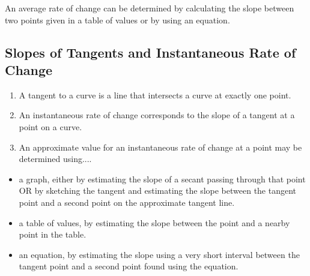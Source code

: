 \documentclass{article}
\begin{document}
An average rate of change can be determined by calculating the slope between two points given in a table of values or by using an equation.

\subsection{Slopes of Tangents and Instantaneous Rate of Change}
\begin{enumerate}
    \item A tangent to a curve is a line that intersects a curve at exactly one point.
    \item An instantaneous rate of change corresponds to the slope of a tangent at a point on a curve.
    \item An approximate value for an instantaneous rate of change at a point may be determined using....
\end{enumerate}
\begin{itemize}
\item a graph, either by estimating the slope of a secant passing through that point OR by sketching the tangent and estimating the slope between the tangent point and a second point on the approximate tangent line.
\item a table of values, by estimating the slope between the point and a nearby point in the table.
\item an equation, by estimating the slope using a very short interval between the tangent point and a second point found using the equation.
\end{itemize}
\end{document}
